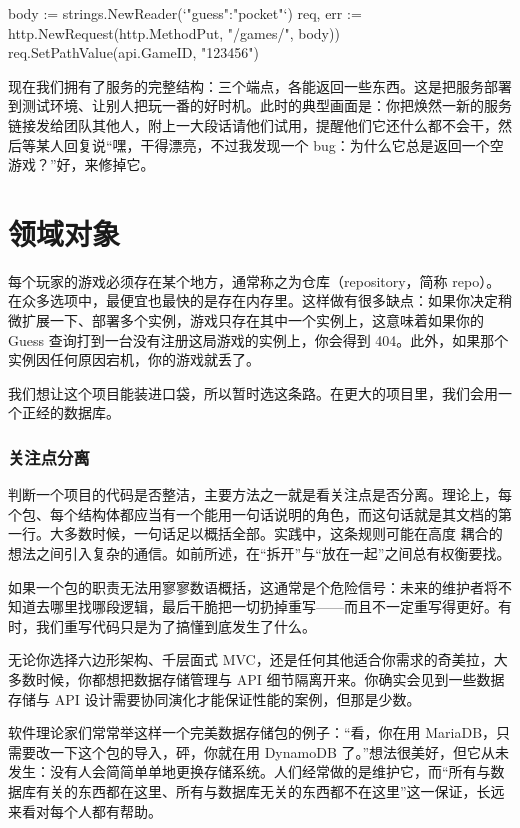 \begin{gocode}[]
body := strings.NewReader(`{"guess":"pocket"}`)
req, err := http.NewRequest(http.MethodPut, "/games/", body))
req.SetPathValue(api.GameID, "123456")
\end{gocode}

现在我们拥有了服务的完整结构：三个端点，各能返回一些东西。这是把服务部署到测试环境、让别人把玩一番的好时机。此时的典型画面是：你把焕然一新的服务链接发给团队其他人，附上一大段话请他们试用，提醒他们它还什么都不会干，然后等某人回复说``嘿，干得漂亮，不过我发现一个 bug：为什么它总是返回一个空游戏？''好，来修掉它。

\section{领域对象}

每个玩家的游戏必须存在某个地方，通常称之为仓库（repository，简称 repo）。在众多选项中，最便宜也最快的是存在内存里。这样做有很多缺点：如果你决定稍微扩展一下、部署多个实例，游戏只存在其中一个实例上，这意味着如果你的 Guess 查询打到一台没有注册这局游戏的实例上，你会得到 404。此外，如果那个实例因任何原因宕机，你的游戏就丢了。

我们想让这个项目能装进口袋，所以暂时选这条路。在更大的项目里，我们会用一个正经的数据库。

\subsubsection*{关注点分离}

判断一个项目的代码是否整洁，主要方法之一就是看关注点是否分离。理论上，每个包、每个结构体都应当有一个能用一句话说明的角色，而这句话就是其文档的第一行。大多数时候，一句话足以概括全部。实践中，这条规则可能在高度
耦合的想法之间引入复杂的通信。如前所述，在``拆开''与``放在一起''之间总有权衡要找。

如果一个包的职责无法用寥寥数语概括，这通常是个危险信号：未来的维护者将不知道去哪里找哪段逻辑，最后干脆把一切扔掉重写——而且不一定重写得更好。有时，我们重写代码只是为了搞懂到底发生了什么。

无论你选择六边形架构、千层面式 MVC，还是任何其他适合你需求的奇美拉，大多数时候，你都想把数据存储管理与 API 细节隔离开来。你确实会见到一些数据存储与 API 设计需要协同演化才能保证性能的案例，但那是少数。

软件理论家们常常举这样一个完美数据存储包的例子：``看，你在用 MariaDB，只需要改一下这个包的导入，砰，你就在用 DynamoDB 了。''想法很美好，但它从未发生：没有人会简简单单地更换存储系统。人们经常做的是维护它，而``所有与数据库有关的东西都在这里、所有与数据库无关的东西都不在这里''这一保证，长远来看对每个人都有帮助。

